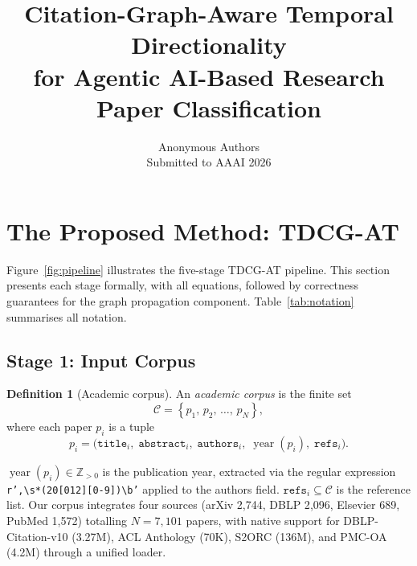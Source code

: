 \documentclass[letterpaper]{article}
\theoremstyle{plain}
\theoremstyle{definition}
\newtheorem{definition}{Definition}
\theoremstyle{remark}
\newcommand{\C}{\mathcal{C}}
\newcommand{\Z}{\mathbb{Z}}
\newcommand{\yd}[1]{\operatorname{year}(#1)}
\newcommand{\set}[1]{\left\{#1\right\}}
\begin{document}
\title{Citation-Graph-Aware Temporal Directionality\\
       for Agentic AI-Based Research Paper Classification}
\author{Anonymous Authors \\ Submitted to AAAI 2026}
\maketitle

\section{The Proposed Method: TDCG-AT}
\label{sec:method}

\noindent
Figure~\ref{fig:pipeline} illustrates the five-stage TDCG-AT
pipeline.
This section presents each stage formally, with all equations,
followed by correctness guarantees for the graph propagation
component.
Table~\ref{tab:notation} summarises all notation.

\subsection{Stage 1: Input Corpus}
\label{sec:input}

\begin{definition}[Academic corpus]
\label{def:corpus}
An \emph{academic corpus} is the finite set
\begin{equation}
    \C = \set{p_1,\, p_2,\, \ldots,\, p_N},
    \label{eq:corpus}
\end{equation}
where each paper $p_i$ is a tuple
\begin{equation}
    p_i = \bigl(
        \mathtt{title}_i,\;
        \mathtt{abstract}_i,\;
        \mathtt{authors}_i,\;
        \yd{p_i},\;
        \mathtt{refs}_i
    \bigr).
    \label{eq:paper}
\end{equation}
\end{definition}

\noindent
$\yd{p_i}\!\in\!\Z_{>0}$ is the publication year,
extracted via the regular expression
\texttt{r',\textbackslash s*(20[012][0-9])\textbackslash b'}
applied to the authors field.
$\mathtt{refs}_i \subseteq \C$ is the reference list.
Our corpus integrates four sources
(arXiv 2{,}744, DBLP 2{,}096, Elsevier 689, PubMed 1{,}572)
totalling $N = 7{,}101$ papers, with native support for
DBLP-Citation-v10 (3.27M), ACL Anthology (70K),
S2ORC (136M), and PMC-OA (4.2M)
through a unified loader.
\end{document}
